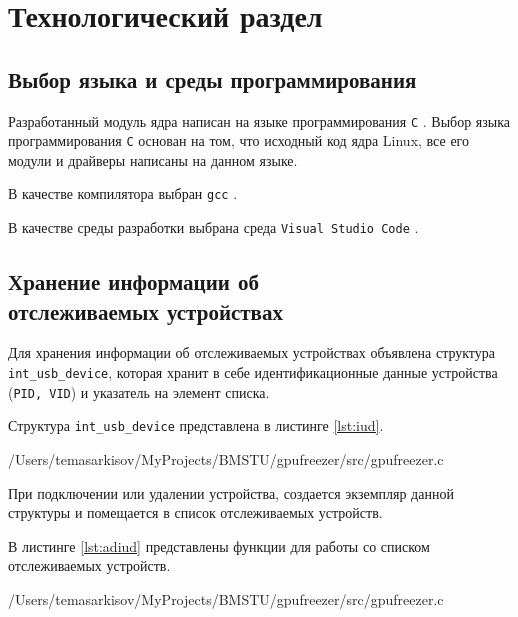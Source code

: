 \chapter{Технологический раздел}

\section{Выбор языка и среды программирования}

Разработанный модуль ядра написан на языке программирования \texttt{C} \cite{c-language}. Выбор языка программирования \texttt{С} основан на том, что исходный код ядра Linux, все его модули и драйверы написаны на данном языке.

В качестве компилятора выбран \texttt{gcc} \cite{gcc}.

В качестве среды разработки выбрана среда \texttt{Visual Studio Code} \cite{vscode}.

\section{Хранение информации об\\отслеживаемых устройствах}

Для хранения информации об отслеживаемых устройствах объявлена структура \texttt{int\_usb\_device}, которая хранит в себе идентификационные данные устройства (\texttt{PID, VID}) и указатель на элемент списка.

Структура \texttt{int\_usb\_device} представлена в листинге \ref{lst:iud}.

\begin{lstinputlisting}[
	caption={Структура \texttt{int\_usb\_device}},
	label={lst:iud},
	style={c},
	linerange={15-20},
	]{/Users/temasarkisov/MyProjects/BMSTU/gpufreezer/src/gpufreezer.c}
\end{lstinputlisting}

При подключении или удалении устройства, создается экземпляр данной структуры и помещается в список отслеживаемых устройств.

\newpage
В листинге \ref{lst:adiud} представлены функции для работы со списком отслеживаемых устройств.

\begin{lstinputlisting}[
	caption={Функции для работы со списком отслеживаемых устройств},
	label={lst:adiud},
	style={c},
	linerange={89-110},
	]{/Users/temasarkisov/MyProjects/BMSTU/gpufreezer/src/gpufreezer.c}
\end{lstinputlisting}

